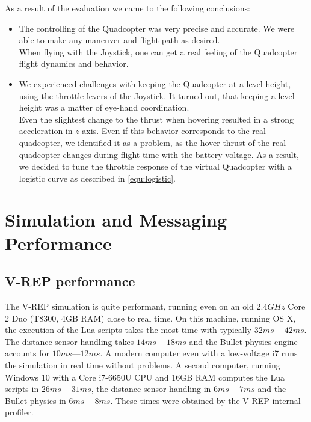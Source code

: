 As a result of the evaluation we came to the following conclusions:

\begin{itemize}
\item{The controlling of the Quadcopter was very precise and accurate. 
We were able to make any maneuver and flight path as desired. \\ 

When flying with the Joystick, one can get a real feeling of the Quadcopter flight dynamics and behavior}.

\item{We experienced challenges with keeping the Quadcopter at a level height, using the throttle levers of the Joystick. 
It turned out, that keeping a level height was a matter of eye-hand coordination. \\

Even the slightest change to the thrust when hovering resulted in a strong acceleration in $z$-axis. 
Even if this behavior corresponds to the real quadcopter, we identified it as a problem, as the hover thrust of the real quadcopter changes during flight time with the battery voltage. 
As a result, we decided to tune the throttle response of the virtual Quadcopter with a logistic curve as described in \ref{equ:logistic}}.

\end{itemize}

\section{Simulation and Messaging  Performance}
\label{sec:performance}
\subsection{V-REP performance}
 The V-REP simulation is quite performant, running even on an old $2.4 GHz$ Core 2 Duo (T8300, 4GB RAM) close to real time.
 On this machine, running OS X, the execution of the Lua scripts takes the most time with typically $32ms - 42ms$.
 The distance sensor handling takes $14ms - 18ms$ and the Bullet physics engine accounts for $10ms — 12ms$.
 A modern computer even with a low-voltage i7 runs the simulation in real time without problems. A second computer, running Windows 10 with a Core i7-6650U CPU and 16GB RAM computes the Lua scripts in $26ms - 31ms$, the distance sensor handling in $6ms - 7ms$ and the Bullet physics in $6ms - 8ms$.
 These times were obtained by  the V-REP internal profiler.
 
